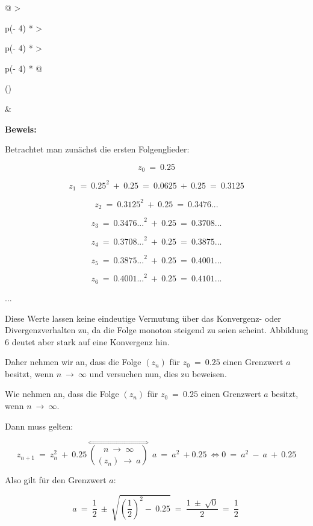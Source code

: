 \documentclass[a4paper, 12pt]{book}
\begin{document}
\begin{longtable}[]{@{}
  >{\raggedright\arraybackslash}p{(\columnwidth - 4\tabcolsep) * }
  >{\raggedright\arraybackslash}p{(\columnwidth - 4\tabcolsep) * }
  >{\raggedright\arraybackslash}p{(\columnwidth - 4\tabcolsep) * }@{}}
\toprule()
\begin{minipage}[b]{\linewidth}\raggedright
\end{minipage} & \begin{minipage}[b]{\linewidth}\raggedright
\textbf{Beweis:}

Betrachtet man zunächst die ersten Folgenglieder:

\[z_{0}\  = \ 0.25\]

\[z_{1}\  = \ {0.25}^{2}\  + \ 0.25\  = \ 0.0625\  + \ 0.25\  = \ 0.3125\]

\[z_{2}\  = \ {0.3125}^{2}\  + \ 0.25\  = \ 0.3476...\]

\[z_{3}\  = \ {0.3476...}^{2}\  + \ 0.25\  = \ 0.3708...\]

\[z_{4}\  = \ {0.3708...}^{2}\  + \ 0.25\  = \ 0.3875...\]

\[z_{5}\  = \ {0.3875...}^{2}\  + \ 0.25\  = \ 0.4001...\]

\[z_{6}\  = \ {0.4001...}^{2}\  + \ 0.25\  = \ 0.4101...\]

...

Diese Werte lassen keine eindeutige Vermutung über das Konvergenz- oder
Divergenzverhalten zu, da die Folge monoton steigend zu seien scheint.
Abbildung 6 deutet aber stark auf eine Konvergenz hin.

Daher nehmen wir an, dass die Folge \(\left( z_{n} \right)\) für
\(z_{0}\  = \ 0.25\) einen Grenzwert \(a\) besitzt, wenn
\(n\  \rightarrow \ \infty\) und versuchen nun, dies zu beweisen.

Wie nehmen an, dass die Folge \(\left( z_{n} \right)\) für
\(z_{0}\  = \ 0.25\) einen Grenzwert \(a\) besitzt, wenn
\(n\  \rightarrow \ \infty\).

Dann muss gelten:

\[z_{n + 1}\  = \ z_{n}^{2}\  + \ 0.25\ \overset{\Leftrightarrow}{\binom{n\  \rightarrow \ \infty}{\left( z_{n} \right)\  \rightarrow \ a}}\ \ a\  = \ a^{2}\  + 0.25\  \Longleftrightarrow 0\  = \ a^{2}\  - \ a\  + \ 0.25\]

Also gilt für den Grenzwert \(a\):

\[a\  = \ \frac{1}{2}\  \pm \ \sqrt{\left( \frac{1}{2} \right)^{2} - \ 0.25}\  = \ \frac{1\  \pm \ \sqrt{0}}{2}\  = \ \frac{1}{2}\ \]


\end{minipage}
\end{longtable}
\end{document}

